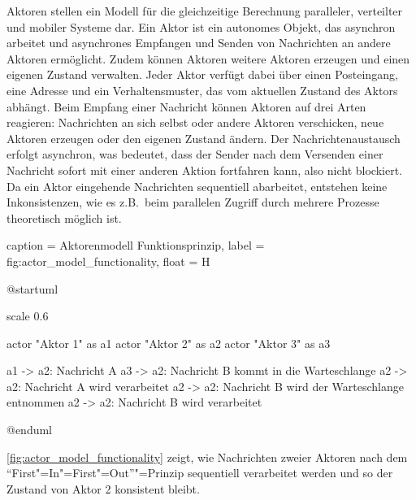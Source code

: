 Aktoren stellen ein Modell für die gleichzeitige Berechnung paralleler, verteilter und mobiler Systeme dar.
Ein Aktor ist ein autonomes Objekt, das asynchron arbeitet und asynchrones Empfangen und Senden von Nachrichten an andere Aktoren ermöglicht.
Zudem können Aktoren weitere Aktoren erzeugen und einen eigenen Zustand verwalten.
Jeder Aktor verfügt dabei über einen Posteingang, eine Adresse und ein Verhaltensmuster, das vom aktuellen Zustand des Aktors abhängt.
Beim Empfang einer Nachricht können Aktoren auf drei Arten reagieren:
Nachrichten an sich selbst oder andere Aktoren verschicken, neue Aktoren erzeugen oder den eigenen Zustand ändern.
Der Nachrichtenaustausch erfolgt asynchron, was bedeutet, dass der Sender nach dem Versenden einer Nachricht sofort mit einer anderen Aktion fortfahren kann, also nicht blockiert.
Da ein Aktor eingehende Nachrichten sequentiell abarbeitet, entstehen keine Inkonsistenzen, wie es z.B.\ beim parallelen Zugriff durch mehrere Prozesse theoretisch möglich ist.

\begin{dhbwfigure}{%
    caption	= Aktorenmodell Funktionsprinzip,
    label	= fig:actor_model_functionality,
    float   = H
}
\begin{plantuml}
@startuml

scale 0.6

actor "Aktor 1" as a1
actor "Aktor 2" as a2
actor "Aktor 3" as a3

a1 -> a2: Nachricht A
a3 -> a2: Nachricht B kommt in die Warteschlange
a2 -> a2: Nachricht A wird verarbeitet
a2 -> a2: Nachricht B wird der Warteschlange entnommen
a2 -> a2: Nachricht B wird verarbeitet

@enduml
\end{plantuml}
\end{dhbwfigure}

\autoref{fig:actor_model_functionality} zeigt, wie Nachrichten zweier Aktoren nach dem \enquote{First"=In"=First"=Out}"=Prinzip sequentiell verarbeitet werden und so der Zustand von Aktor 2 konsistent bleibt.
